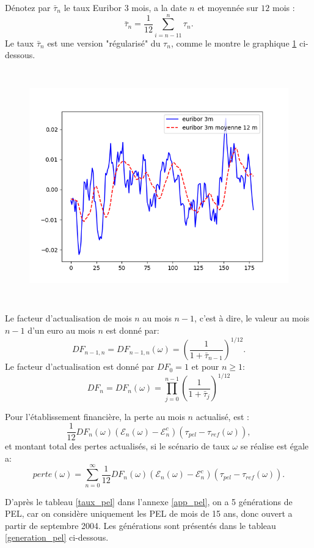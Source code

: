 \documentclass[12pt, a4paper]{book}
\newcommand{\E}{\mathcal{E}}
\begin{document}
Dénotez par $\bar{\tau}_n$ le taux Euribor 3 mois, a la date $n$ et moyennée sur $12$ mois :
$$\bar{\tau}_n =\frac{1}{12}\sum_{i=n-11}^n \tau_n.$$
Le taux $\bar{\tau}_n$ est une version "régularisé" du $\tau_n$, comme le montre le graphique \ref{euribor3m_vs_moy_3m} ci-dessous.

\begin{figure}[!h]
\label{euribor3m_vs_moy_3m}
\centering
\includegraphics[height=10cm,width=16cm]{euribor3m_vs_moy_3m.png}
\end{figure}

Le facteur d'actualisation de mois $n$ au mois $n-1$, c'est à dire, le valeur au mois $n-1$ d'un euro au mois $n$ est donné par:
$$DF_{n-1,n} = DF_{n-1,n}(\omega) = \left(\frac{1}{1 + \bar{\tau}_{n-1}}\right)^{1/12}.$$
Le facteur d'actualisation est donné par $DF_0 = 1$ et pour $n\geq 1$:
$$DF_n = DF_n(\omega) = \prod_{j=0}^{n-1} \left(\frac{1}{1 + \bar{\tau}_{j}}\right)^{1/12}  $$

Pour l'établissement financière, la perte au mois $n$ actualisé, est :
$$\frac{1}{12}DF_n(\omega)(\E_n(\omega) - \E_n^c)(\tau_{pel} - \tau_{ref}(\omega)),$$
et montant total des pertes actualisés, si le scénario de taux $\omega$ se réalise est égale a:
\begin{equation}\label{perte}
perte(\omega)=\sum_{n=0}^{\infty}\frac{1}{12}DF_n(\omega)(\E_n(\omega) - \E_n^c)(\tau_{pel} - \tau_{ref}(\omega)).
\end{equation}

D'après le tableau \ref{taux_pel} dans l'annexe \ref{app_pel}, on a 5 générations de PEL, car on considère uniquement les PEL de mois de 15 ans, donc ouvert a partir de septembre 2004. Les générations sont  présentés dans le tableau \ref{generation_pel} ci-dessous.
\end{document}
